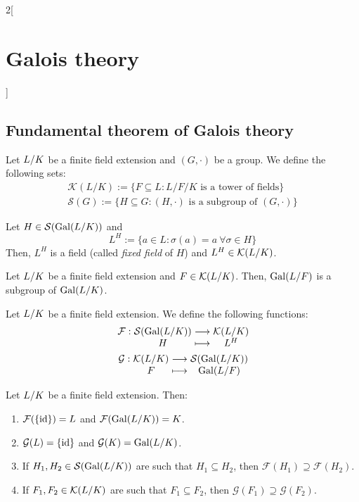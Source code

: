 \documentclass[../../../main.tex]{subfiles}
\begin{document}
\begin{multicols}{2}[\section{Galois theory}]
  \subsection{Fundamental theorem of Galois theory}
  \begin{definition}
    Let $\quot{L}{K}$ be a finite field extension and $(G,\cdot)$ be a group. We define the following sets:
    \begin{gather*}
      \mathcal{K}(L/K):=\{F\subseteq L:L/F/K\text{ is a tower of fields}\}\\
      \mathcal{S}(G):=\{H\subseteq G:(H,\cdot)\text{ is a subgroup of }(G,\cdot)\}
    \end{gather*}
  \end{definition}
  \begin{lemma}
    Let $H\in\mathcal{S}(\Gal(\quot{L}{K}))$ and $$L^H:=\{a\in L:\sigma(a)=a\ \forall\sigma\in H\}$$
    Then, $L^H$ is a field (called \textit{fixed field} of $H$) and $L^H\in\mathcal{K}(\quot{L}{K})$.
  \end{lemma}
  \begin{lemma}
    Let $\quot{L}{K}$ be a finite field extension and $F\in \mathcal{K}(\quot{L}{K})$. Then, $\Gal(\quot{L}{F})$ is a subgroup of $\Gal(\quot{L}{K})$.
  \end{lemma}
  \begin{definition}
    Let $\quot{L}{K}$ be a finite field extension. We define the following functions:
    \begin{gather*}
      \function{\mathcal{F}}{\mathcal{S}(\Gal(\quot{L}{K}))}{\mathcal{K}(\quot{L}{K})}{H}{L^H}\\
      \function{\mathcal{G}}{\mathcal{K}(\quot{L}{K})}{\mathcal{S}(\Gal(\quot{L}{K}))}{F}{\Gal(\quot{L}{F})}
    \end{gather*}
  \end{definition}
  \begin{prop}
    Let $\quot{L}{K}$ be a finite field extension. Then:
    \begin{enumerate}
      \item $\mathcal{F}(\{\mathrm{id}\})=L$ and $\mathcal{F}(\Gal(\quot{L}{K}))=K$.
      \item $\mathcal{G}(L)=\{\mathrm{id}\}$ and $\mathcal{G}(K)=\Gal(\quot{L}{K})$.
      \item If $H_1,H_2\in\mathcal{S}(\Gal(\quot{L}{K}))$ are such that $H_1\subseteq H_2$, then $\mathcal{F}(H_1)\supseteq \mathcal{F}(H_2)$.
      \item If $F_1,F_2\in\mathcal{K}(\quot{L}{K})$ are such that $F_1\subseteq F_2$, then $\mathcal{G}(F_1)\supseteq \mathcal{G}(F_2)$.

\end{enumerate}
\end{prop}
\end{multicols}
\end{document}
